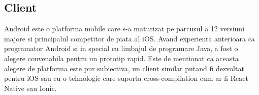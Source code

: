 \subsection {Client}

Android este o platforma mobile care s-a maturizat pe parcusul a 12 versiuni majore si principalul competitor de piata al iOS. Avand experienta anterioara ca programator Android si in special cu limbajul de programare Java, a fost o alegere convenabila pentru un prototip rapid.
Este de mentionat ca aceasta alegere de platforma este pur subiectiva, un client similar putand fi dezvoltat pentru iOS sau cu o tehnologie care suporta cross-compilation cum ar fi React Native sau Ionic.
